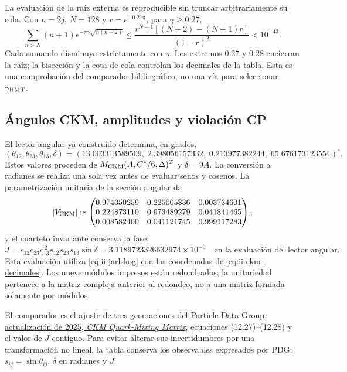La evaluación de la raíz externa es reproducible sin truncar
arbitrariamente su cola. Con \(n=2j\), \(N=128\) y
\(r=e^{-0.27\pi}\), para \(\gamma\geq0.27\),
\[
 \sum_{n>N}(n+1)e^{-\pi\gamma\sqrt{n(n+2)}}
 \leq \frac{r^{N+1}[(N+2)-(N+1)r]}{(1-r)^2}<10^{-43}.
\]
Cada sumando disminuye estrictamente con \(\gamma\). Los extremos
\(0.27\) y \(0.28\) encierran la raíz; la bisección y la cota de cola
controlan los decimales de la tabla. Esta es una comprobación del
comparador bibliográfico, no una vía para seleccionar \(\gamma_{\rm HMT}\).

\subsection{Ángulos CKM, amplitudes y violación CP}

El lector angular ya construido determina, en grados,
\begin{equation}
 (\theta_{12},\theta_{23},\theta_{13},\delta)
 =(13.003313589509,\;2.398056157332,\;
 0.213977382244,\;65.676173123554)^\circ.
 \label{eq:ii-ckm-decimales}
\end{equation}
Estos valores proceden de \(M_{\rm CKM}(A,C^*/6,\Delta)^T\) y
\(\delta=9A\). La conversión a radianes se realiza una sola vez antes
de evaluar senos y cosenos. La parametrización unitaria de la sección
angular da
\[
 |V_{\rm CKM}|\simeq
 \begin{pmatrix}
 0.974350259&0.225005836&0.003734601\\
 0.224873110&0.973489279&0.041841465\\
 0.008582400&0.041121745&0.999117283
 \end{pmatrix},
\]
y el cuarteto invariante conserva la fase:
\[
 J=c_{12}c_{23}c_{13}^{\,2}s_{12}s_{23}s_{13}\sin\delta
 =3.1189723326632974\times10^{-5}\quad
 \text{en la evaluación del lector angular.}
\]
Esta evaluación utiliza \eqref{eq:ii-jarlskog} con las coordenadas de
\eqref{eq:ii-ckm-decimales}. Los nueve módulos impresos están redondeados; la unitariedad pertenece
a la matriz compleja anterior al redondeo, no a una matriz formada
solamente por módulos.

El comparador es el ajuste de tres generaciones del
\href{https://pdg.lbl.gov/2025/reviews/rpp2025-rev-ckm-matrix.pdf}
{Particle Data Group, actualización de 2025, \emph{CKM Quark-Mixing Matrix}},
ecuaciones (12.27)--(12.28) y el valor de \(J\) contiguo. Para evitar
alterar sus incertidumbres por una transformación no lineal, la tabla
conserva los observables expresados por PDG: \(s_{ij}=\sin\theta_{ij}\),
\(\delta\) en radianes y \(J\).

